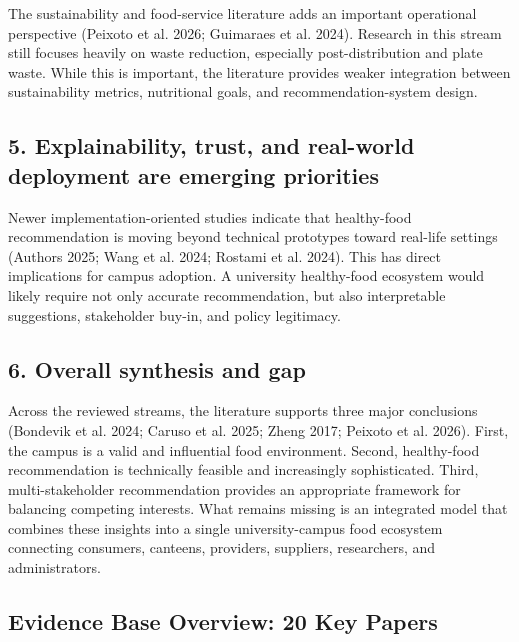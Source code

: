 \documentclass[
  letterpaper,
  DIV=11,
  numbers=noendperiod]{scrartcl}
\begin{document}
The sustainability and food-service literature adds an important
operational perspective ({Peixoto et al.} 2026; {Guimaraes et al.}
2024). Research in this stream still focuses heavily on waste reduction,
especially post-distribution and plate waste. While this is important,
the literature provides weaker integration between sustainability
metrics, nutritional goals, and recommendation-system design.

\subsection{5. Explainability, trust, and real-world deployment are
emerging
priorities}\label{explainability-trust-and-real-world-deployment-are-emerging-priorities}

Newer implementation-oriented studies indicate that healthy-food
recommendation is moving beyond technical prototypes toward real-life
settings (Authors 2025; {Wang et al.} 2024; {Rostami et al.} 2024). This
has direct implications for campus adoption. A university healthy-food
ecosystem would likely require not only accurate recommendation, but
also interpretable suggestions, stakeholder buy-in, and policy
legitimacy.

\subsection{6. Overall synthesis and
gap}\label{overall-synthesis-and-gap}

Across the reviewed streams, the literature supports three major
conclusions ({Bondevik et al.} 2024; {Caruso et al.} 2025; Zheng 2017;
{Peixoto et al.} 2026). First, the campus is a valid and influential
food environment. Second, healthy-food recommendation is technically
feasible and increasingly sophisticated. Third, multi-stakeholder
recommendation provides an appropriate framework for balancing competing
interests. What remains missing is an integrated model that combines
these insights into a single university-campus food ecosystem connecting
consumers, canteens, providers, suppliers, researchers, and
administrators.

\subsection{Evidence Base Overview: 20 Key
Papers}\label{evidence-base-overview-20-key-papers}
\end{document}
